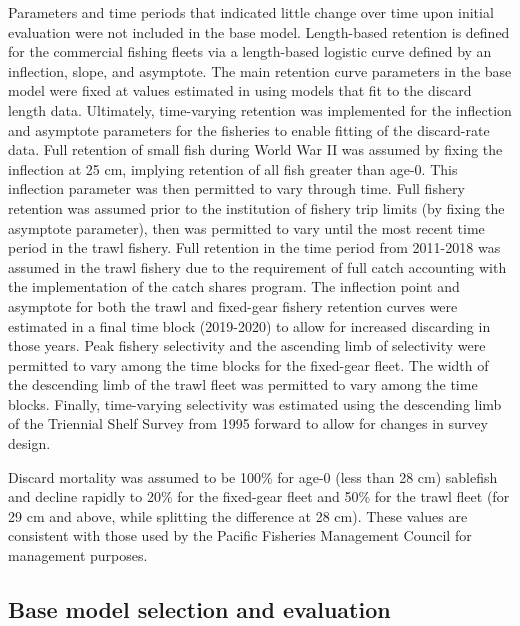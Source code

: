 \documentclass[11pt,
  english,
  a4paper,
]{article}
\begin{document}
Parameters and time periods that indicated little change over time upon initial evaluation were not included in the base model. Length-based retention is defined for the commercial fishing fleets via a length-based logistic curve defined by an inflection, slope, and asymptote. The main retention curve parameters in the base model were fixed at values estimated in using models that fit to the discard length data. Ultimately, time-varying retention was implemented for the inflection and asymptote parameters for the fisheries to enable fitting of the discard-rate data. Full retention of small fish during World War II was assumed by fixing the inflection at 25 cm, implying retention of all fish greater than age-0. This inflection parameter was then permitted to vary through time. Full fishery retention was assumed prior to the institution of fishery trip limits (by fixing the asymptote parameter), then was permitted to vary until the most recent time period in the trawl fishery. Full retention in the time period from 2011-2018 was assumed in the trawl fishery due to the requirement of full catch accounting with the implementation of the catch shares program. The inflection point and asymptote for both the trawl and fixed-gear fishery retention curves were estimated in a final time block (2019-2020) to allow for increased discarding in those years. Peak fishery selectivity and the ascending limb of selectivity were permitted to vary among the time blocks for the fixed-gear fleet. The width of the descending limb of the trawl fleet was permitted to vary among the time blocks. Finally, time-varying selectivity was estimated using the descending limb of the Triennial Shelf Survey from 1995 forward to allow for changes in survey design.

\leavevmode\tagmcend\tagstructend\par


Discard mortality was assumed to be 100\% for age-0 (less than 28 cm) sablefish and decline rapidly to 20\% for the fixed-gear fleet and 50\% for the trawl fleet (for 29 cm and above, while splitting the difference at 28 cm). These values are consistent with those used by the Pacific Fisheries Management Council for management purposes.

\leavevmode\tagmcend\tagstructend\par


\hypertarget{base-model-selection-and-evaluation}{%
\subsection{Base model selection and evaluation}\label{base-model-selection-and-evaluation}}
\end{document}
